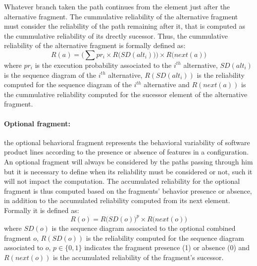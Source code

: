 Whatever branch taken the path continues from the element just after the
alternative fragment. The cummulative reliability of the alternative fragment
must consider the reliability of the path remaining after it, that is computed
as the cummulative reliability of its drectly sucessor. Thus, the cummulative
reliability of the alternative fragment is formally defined as: \begin{equation}
	\label{eq:altFragmentReliability}R(a) = \Big(\sum pr_{i} \times
	R\big(SD(alt_{i})\big)\Big) \times R\big(next(a)\big) \end{equation} where $pr_{i}$ is the
execution probability associated to the $i^{th}$ alternative, $SD(alt_{i})$ is the
sequence diagram of the $i^{th}$ alternative, $R(SD(alt_i))$ is the reliability
computed for the sequence diagram of the $i^{th}$ alternative and $R(next(a))$ is
the cummulative reliability computed for the sucessor element of the alternative
fragment.

\paragraph{Optional fragment: \label{subsec:relOptionFragment}}
the optional behavioral fragment represents the behavioral variability of
software product lines according to the presence or absence of features in a configuration. 
An optional fragment will always be considered by the paths passing
through him but it is necessary to define when its reliability must be
considered or not, such it will not impact the computation. The accumulated
reliability for the optional fragment is thus computed based on the fragments'
behavior presence or absence, in addition to the accumulated reliability
computed from its next element. Formally it is defined as: \begin{equation}
	\label{eq:optionalFragmentReliability}R(o) = R\big(SD(o)\big)^{p} \times
	R\big(next(o)\big)\end{equation} where $SD(o)$ is the sequence diagram
associated to the optional combined fragment $o$, $R(SD(o))$ is the reliability
computed for the sequence diagram associated to $o$, $p \in \{0,1\}$ indicates
the fragment presence (1) or absence (0) and $R(next(o))$ is the accumulated 
reliability of the fragment's sucessor. 

